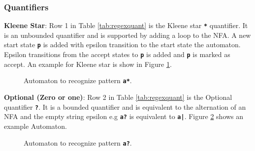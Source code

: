 \subsubsection{Quantifiers}
\textbf{Kleene Star}: Row 1 in Table \ref{tab:regexquant} is the Kleene star \texttt{\textbf{*}} quantifier. It is an unbounded quantifier and is supported by adding a loop to the NFA. A new start state \texttt{\textbf{p}} is added with epsilon transition to the start state the automaton. Epsilon transitions from the accept states to \texttt{\textbf{p}} is added and \texttt{\textbf{p}} is marked as accept. An example for Kleene star is show in Figure \ref{fig:autoq1}.

\begin{figure}[H]
\centering
{}
\caption{Automaton to recognize pattern \texttt{\textbf{a*}}.}
\label{fig:autoq1}
\end{figure}



\noindent
\textbf{Optional (Zero or one)}: Row 2 in Table \ref{tab:regexquant} is the Optional quantifier \texttt{\textbf{?}}. It is a bounded quantifier and is  equivalent to the alternation of an NFA and the empty string epsilon e.g \texttt{\textbf{a?}} is equivalent to \texttt{\textbf{a|\epsilon}}. Figure \ref{fig:autoq3} shows an example Automaton.


\begin{figure}[htpb]
\centering
{}
\caption{Automaton to recognize pattern \texttt{\textbf{a?}}.}
\label{fig:autoq3}
\end{figure}

